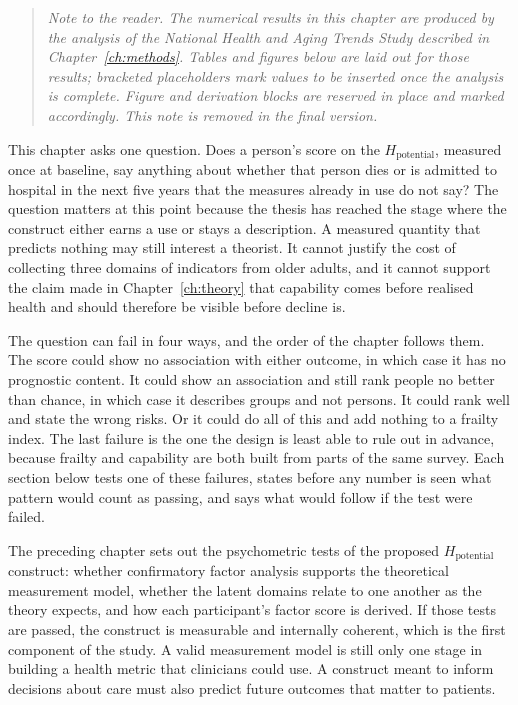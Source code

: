 \begin{quote}
\small\itshape
Note to the reader. The numerical results in this chapter are produced by the analysis of the National Health and Aging Trends Study described in Chapter~\ref{ch:methods}. Tables and figures below are laid out for those results; bracketed placeholders mark values to be inserted once the analysis is complete. Figure and derivation blocks are reserved in place and marked accordingly. This note is removed in the final version.
\end{quote}

\noindent This chapter asks one question. Does a person's score on the $H_{\text{potential}}$, measured once at baseline, say anything about whether that person dies or is admitted to hospital in the next five years that the measures already in use do not say? The question matters at this point because the thesis has reached the stage where the construct either earns a use or stays a description. A measured quantity that predicts nothing may still interest a theorist. It cannot justify the cost of collecting three domains of indicators from older adults, and it cannot support the claim made in Chapter~\ref{ch:theory} that capability comes before realised health and should therefore be visible before decline is.

The question can fail in four ways, and the order of the chapter follows them. The score could show no association with either outcome, in which case it has no prognostic content. It could show an association and still rank people no better than chance, in which case it describes groups and not persons. It could rank well and state the wrong risks. Or it could do all of this and add nothing to a frailty index. The last failure is the one the design is least able to rule out in advance, because frailty and capability are both built from parts of the same survey. Each section below tests one of these failures, states before any number is seen what pattern would count as passing, and says what would follow if the test were failed.

The preceding chapter sets out the psychometric tests of the proposed $H_{\text{potential}}$ construct: whether confirmatory factor analysis supports the theoretical measurement model, whether the latent domains relate to one another as the theory expects, and how each participant's factor score is derived. If those tests are passed, the construct is measurable and internally coherent, which is the first component of the study. A valid measurement model is still only one stage in building a health metric that clinicians could use. A construct meant to inform decisions about care must also predict future outcomes that matter to patients.

